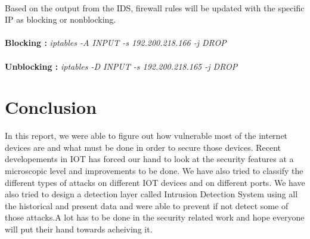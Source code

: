 \documentclass{report}
\begin{document}
\paragraph{}
Based on the output from the IDS, firewall rules will be updated with the specific IP as blocking or nonblocking.

\paragraph{}
\textbf{Blocking : }\textit{iptables -A INPUT -s 192.200.218.166 -j DROP}

\paragraph{}
\textbf{Unblocking : }\textit{iptables -D INPUT -s 192.200.218.165 -j DROP}

\section{Conclusion}
In this report, we were able to figure out how vulnerable most of the internet devices are and what must be done in order to secure those devices. Recent developements in IOT has forced our hand to look at the security features at a microscopic level and improvements to be done. We have also tried to classify the different types of attacks on different IOT devices and on different ports. We have also tried to design a detection layer called Intrusion Detection System using all the historical and present data and were able to prevent if not detect some of those attacks.A lot has to be done in the security related work and hope everyone will put their hand towards acheiving it.
\end{document}
